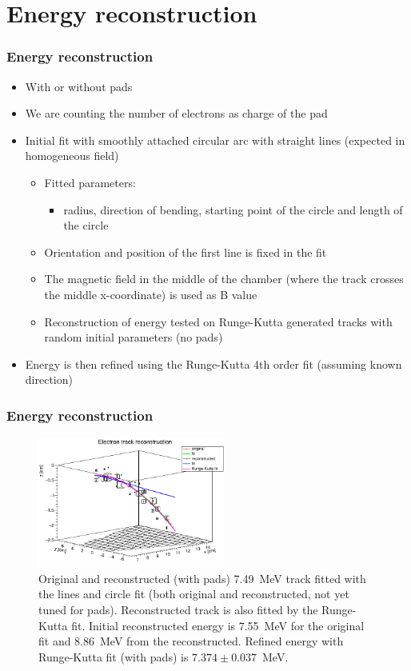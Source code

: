 \documentclass{beamer}
\begin{document}
	\section{Energy reconstruction}
	\begin{frame}
		\frametitle{Energy reconstruction}
		\begin{itemize}
			\item With or without pads
			\item We are counting the number of electrons as charge of the pad
			\item Initial fit with smoothly attached circular arc with straight lines (expected in homogeneous field)
			\begin{itemize}
				\item Fitted parameters:
				\begin{itemize}
					\item radius, direction of bending, starting point of the circle and length of the circle
				\end{itemize}
				\item Orientation and position of the first line is fixed in the fit
				\item The magnetic field in the middle of the chamber (where the track crosses the middle x-coordinate) is used as B value
				\item Reconstruction of energy tested on Runge-Kutta generated tracks with random initial parameters (no pads)
			\end{itemize}
			\item Energy is then refined using the Runge-Kutta 4th order fit (assuming known direction)
		\end{itemize}	
	\end{frame}
	\begin{frame}
		\frametitle{Energy reconstruction}
		\begin{figure}
			\centering
			\includegraphics[width=0.55\textwidth]{images/track_fits.png}
			\caption{Original and reconstructed (with pads) 7.49~MeV track fitted with the lines and circle fit (both original and reconstructed, not yet tuned for pads). Reconstructed track is also fitted by the Runge-Kutta fit. Initial reconstructed energy is 7.55~MeV for the original fit and 8.86~MeV from the reconstructed. Refined energy with Runge-Kutta fit (with pads) is $7.374 \pm 0.037$~MeV.}
		\end{figure}
	\end{frame}
\end{document}
